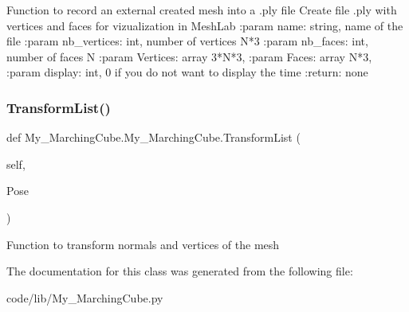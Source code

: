 \begin{DoxyVerb}Function to record an external created mesh into a .ply file
Create file .ply with vertices and faces for vizualization in MeshLab
:param name: string, name of the file
:param nb_vertices: int, number of vertices N*3
:param nb_faces: int, number of faces N
:param Vertices: array 3*N*3,
:param Faces: array N*3,
:param display: int, 0 if you do not want to display the time
:return: none
\end{DoxyVerb}
 \mbox{\label{class_my___marching_cube_1_1_my___marching_cube_a063b11ec768a65b5b73159c6eed61e32}} 
\subsubsection{\texorpdfstring{Transform\+List()}{TransformList()}}
{\footnotesize\ttfamily def My\+\_\+\+Marching\+Cube.\+My\+\_\+\+Marching\+Cube.\+Transform\+List (\begin{DoxyParamCaption}\item[{}]{self,  }\item[{}]{Pose }\end{DoxyParamCaption})}

\begin{DoxyVerb}    Function to transform normals and vertices of the mesh
\end{DoxyVerb}
 

The documentation for this class was generated from the following file\+:\begin{DoxyCompactItemize}
\item 
code/lib/My\+\_\+\+Marching\+Cube.\+py\end{DoxyCompactItemize}
